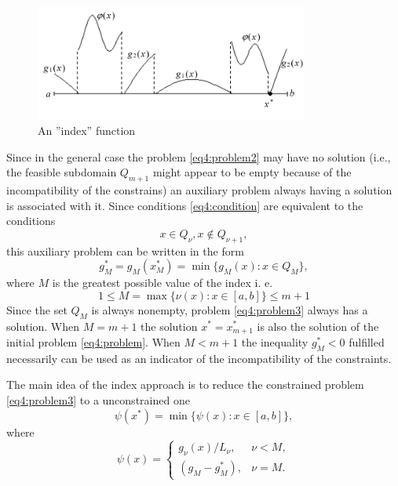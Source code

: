 \begin{figure}[ht]
  \centering
  \includegraphics[width=0.8\textwidth]{figures/4_3.png}
  \caption{An ''index'' function}
  \label{fig:4_3}
\end{figure}

Since in the general case the problem \eqref{eq4:problem2} may have no solution (i.e., the feasible subdomain $Q_{m+1}$ might appear to be empty because of the incompatibility of the constrains) an auxiliary problem always having a solution is associated with it. Since conditions \eqref{eq4:condition} are equivalent to the conditions
\begin{displaymath}
  x\in Q_\nu,x\not\in Q_{\nu+1},
\end{displaymath}
this auxiliary problem can be written in the form
\begin{equation}
  \label{eq4:problem3}
  g_M^*=g_M(x_M^*)=\min\{g_M(x):x\in Q_M\},
\end{equation}
where $M$ is the greatest possible value of the index i. e.
\begin{equation}
  1\le M=\max\{\nu(x):x\in[a,b]\}\le m+1
\end{equation}
Since the set $Q_M$ is always nonempty, problem \eqref{eq4:problem3} always has a solution. When $M=m+1$ the solution $x^*=x^*_{m+1}$  is also the solution of the initial problem \eqref{eq4:problem}. When $M<m+1$ the inequality $g_M^*<0$ fulfilled necessarily can be used as an indicator of the incompatibility of the constraints.

The main idea of the index approach is to reduce the constrained problem \eqref{eq4:problem3} to a unconstrained one
\begin{displaymath}
  \psi(x^*)=\min\{\psi(x):x\in[a,b]\},
\end{displaymath}
where
\begin{equation}
  \psi(x)=
  \begin{cases}
    g_\nu(x)/L_\nu, & \nu < M, \\
    (g_M-g_M^*), & \nu=M.
  \end{cases}
\end{equation}

